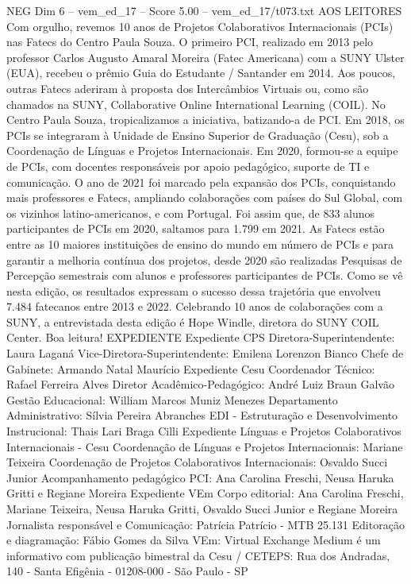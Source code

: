 \begin{textsample}{NEG Dim 6 – vem\_ed\_17 – Score 5.00 – vem\_ed\_17/t073.txt}  \label{ex:f6_neg_123}
AOS LEITORES Com orgulho, revemos 10 anos de Projetos Colaborativos Internacionais (PCIs) nas Fatecs do Centro Paula Souza.
O primeiro PCI, realizado em 2013 pelo professor Carlos Augusto Amaral Moreira (Fatec Americana) com a SUNY Ulster (EUA), recebeu o prêmio Guia do Estudante / Santander em 2014.
Aos poucos, outras Fatecs aderiram à proposta dos Intercâmbios Virtuais ou, como são chamados na SUNY, Collaborative Online International Learning (COIL).
No Centro Paula Souza, tropicalizamos a iniciativa, batizando-a de PCI.
Em 2018, os PCIs se integraram à Unidade de Ensino Superior de Graduação (Cesu), sob a Coordenação de Línguas e Projetos Internacionais.
Em 2020, formou-se a equipe de PCIs, com docentes responsáveis por apoio pedagógico, suporte de TI e comunicação.
O ano de 2021 foi marcado pela expansão dos PCIs, conquistando mais professores e Fatecs, ampliando colaborações com países do Sul Global, com os vizinhos latino-americanos, e com Portugal.
Foi assim que, de 833 alunos participantes de PCIs em 2020, saltamos para 1.799 em 2021.
As Fatecs estão entre as 10 maiores instituições de ensino do mundo em número de PCIs e para garantir a melhoria contínua dos projetos, desde 2020 são realizadas Pesquisas de Percepção semestrais com alunos e professores participantes de PCIs.
Como se vê nesta edição, os resultados expressam o sucesso dessa trajetória que envolveu 7.484 fatecanos entre 2013 e 2022.
Celebrando 10 anos de colaborações com a SUNY, a entrevistada desta edição é Hope Windle, diretora do SUNY COIL Center.
Boa leitura!
EXPEDIENTE Expediente CPS Diretora-Superintendente: Laura Laganá Vice-Diretora-Superintendente: Emilena Lorenzon Bianco Chefe de Gabinete: Armando Natal Maurício Expediente Cesu Coordenador Técnico: Rafael Ferreira Alves Diretor Acadêmico-Pedagógico: André Luiz Braun Galvão Gestão Educacional: William Marcos Muniz Menezes Departamento Administrativo: Sílvia Pereira Abranches EDI - Estruturação e Desenvolvimento Instrucional: Thais Lari Braga Cilli Expediente Línguas e Projetos Colaborativos Internacionais - Cesu Coordenação de Línguas e Projetos Internacionais: Mariane Teixeira Coordenação de Projetos Colaborativos Internacionais: Osvaldo Succi Junior Acompanhamento pedagógico PCI: Ana Carolina Freschi, Neusa Haruka Gritti e Regiane Moreira Expediente VEm Corpo editorial: Ana Carolina Freschi, Mariane Teixeira, Neusa Haruka Gritti, Osvaldo Succi Junior e Regiane Moreira Jornalista responsável e Comunicação: Patrícia Patrício - MTB 25.131 Editoração e diagramação: Fábio Gomes da Silva VEm: Virtual Exchange Medium é um informativo com publicação bimestral da Cesu / CETEPS: Rua dos Andradas, 140 - Santa Efigênia - 01208-000 - São Paulo - SP

\end{textsample}
